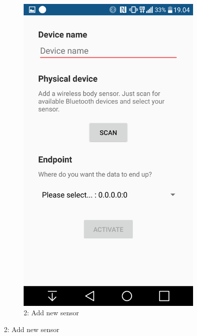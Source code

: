 \begin{figure}[H]
\begin{subfigure}[b]{0.45\textwidth}
        \includegraphics[width=\textwidth]{img/gw2.png}
        \caption*{2: Add new sensor}
        \label{fig:14dbpassword}
    \end{subfigure}
\end{figure}

\newpage

